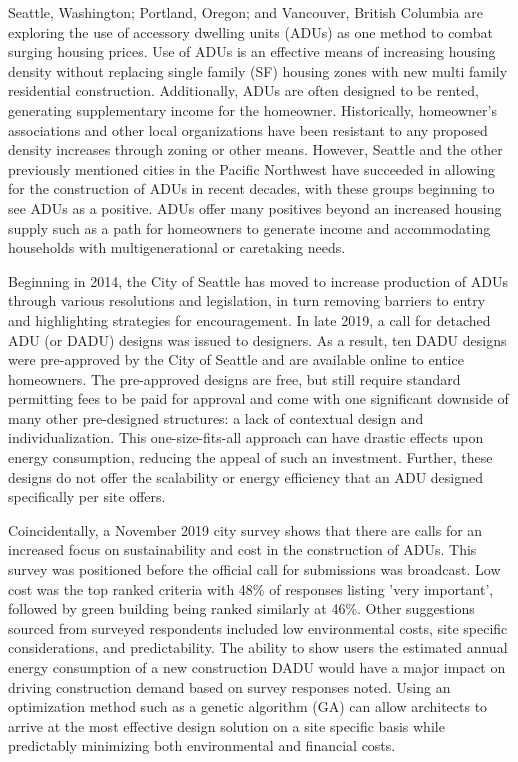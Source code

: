 \documentclass[sagev,times,Review,doublespace]{sagej}
\begin{document}
Seattle, Washington; Portland, Oregon; and Vancouver, British Columbia are exploring the use of accessory dwelling units (ADUs) as one method to combat surging housing prices. Use of ADUs is an effective means of increasing housing density without replacing single family (SF) housing zones with new multi family residential construction. Additionally, ADUs are often designed to be rented, generating supplementary income for the homeowner. Historically, homeowner’s associations and other local organizations have  been resistant to any proposed density increases through zoning or other means\cite{10.2307/24392672}. However, Seattle and the other previously mentioned cities in the Pacific Northwest have succeeded in allowing for the construction of ADUs in recent decades, with these groups beginning to see ADUs as a positive. ADUs offer many positives beyond an increased housing supply such as a path for homeowners to generate income and accommodating households with multigenerational or caretaking needs.

Beginning in 2014, the City of Seattle has moved to increase production of ADUs through various resolutions and legislation, in turn removing barriers to entry and highlighting strategies for encouragement. In late 2019, a call for detached ADU (or DADU) designs was issued to designers. As a result, ten DADU designs were pre-approved by the City of Seattle and are available online to entice homeowners\cite{ADUniversePreapprovedADU}. The pre-approved designs are free, but still require standard permitting fees to be paid for approval and come with one significant downside of many other pre-designed structures: a lack of contextual design and individualization. This one-size-fits-all approach can have drastic effects upon energy consumption, reducing the appeal of such an investment. Further, these designs do not offer the scalability or energy efficiency that an ADU designed specifically per site offers.

 Coincidentally, a November 2019 city survey shows that there are calls for an increased focus on sustainability and cost in the construction of ADUs\cite{seattlePreapprovedPlansAccessory2019}. This survey was positioned before the official call for submissions was broadcast. Low cost was the top ranked criteria with 48\% of responses listing 'very important', followed by green building being ranked similarly at 46\%. Other suggestions sourced from surveyed respondents included low environmental costs, site specific considerations, and predictability. The ability to show users the estimated annual energy consumption of a new construction DADU would have a major impact on driving construction demand based on survey responses noted. Using an optimization method such as a genetic algorithm (GA) can allow architects to arrive at the most effective design solution on a site specific basis while predictably minimizing both environmental and financial costs. 
 
\end{document}
